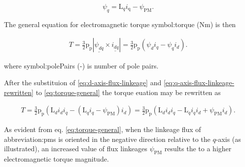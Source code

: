 \documentclass[a4paper, twoside, 11pt]{article}
\begin{document}
        \begin{equation}\label{eq:q-axis-flux-linkeage-rewritten}
            \psi_q = \text{L}_q i_\text{q} - \psi_\text{PM}.
        \end{equation}
        
        The general equation for electromagnetic torque \gls{symbol:torque} (Nm) is then

        \begin{equation}\label{eq:torque-general}
            \begin{gathered}
                T = \frac{3}{2} \text{p}_\text{p} | \underline{\psi_{dq}} \times \underline{i_{dq}} | = \frac{3}{2} \text{p}_\text{p} (\psi_d i_q - \psi_q i_d).
            \end{gathered}
        \end{equation}

        where \gls{symbol:polePairs} (-) is number of pole pairs.\par

        After the substituion of \ref{eq:d-axis-flux-linkeage} and \ref{eq:q-axis-flux-linkeage-rewritten} to \ref{eq:torque-general} the torque euation may be rewritten as


        \begin{equation}\label{eq:torque-pmsynrelm}
            \begin{gathered}
                T = \frac{3}{2} \text{p}_\text{p} (\text{L}_d i_d i_q - (\text{L}_q i_q -\psi_\text{PM}) i_d) = \frac{3}{2} \text{p}_\text{p} (\text{L}_d i_d i_q - \text{L}_q i_q i_d + \psi_\text{PM} i_d).
            \end{gathered}
        \end{equation}

        \par
        As evident from eq. \ref{eq:torque-general}, when the linkeage flux of \gls{abbreviation:pm}s is oriented in the negative direction relative to the $q$-axis (as illustrated), an increased value of flux linkeages $\psi_\text{PM}$ results the to a higher electromagnetic torque magnitude.\par
        
\end{document}
